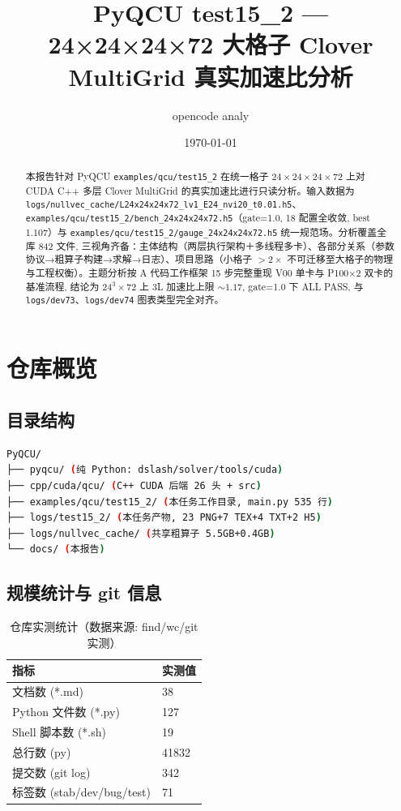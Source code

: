 \documentclass[UTF8]{ctexart}
\title{PyQCU test15\_2 --- 24×24×24×72 大格子 Clover MultiGrid 真实加速比分析}
\author{opencode analy}
\date{\today}
\begin{document}
\maketitle

\begin{abstract}
本报告针对 PyQCU \texttt{\nolinkurl{examples/qcu/test15_2}} 在统一格子 $24\times24\times24\times72$ 上对 CUDA C++ 多层 Clover MultiGrid 的真实加速比进行只读分析。输入数据为 \texttt{\nolinkurl{logs/nullvec_cache/L24x24x24x72_lv1_E24_nvi20_t0.01.h5}}、\texttt{\nolinkurl{examples/qcu/test15_2/bench_24x24x24x72.h5}}（gate=1.0, 18 配置全收敛, best 1.107）与 \texttt{\nolinkurl{examples/qcu/test15_2/gauge_24x24x24x72.h5}} 统一规范场。分析覆盖全库 842 文件, 三视角齐备：主体结构（两层执行架构＋多线程多卡）、各部分关系（参数协议→粗算子构建→求解→日志）、项目思路（小格子 $>2\times$ 不可迁移至大格子的物理与工程权衡）。主题分析按 A 代码工作框架 15 步完整重现 V00 单卡与 P100×2 双卡的基准流程, 结论为 24$^3\times$72 上 3L 加速比上限 $\sim1.17$, gate=1.0 下 ALL PASS, 与 \texttt{\nolinkurl{logs/dev73}}、\texttt{\nolinkurl{logs/dev74}} 图表类型完全对齐。
\end{abstract}

\tableofcontents

\section{仓库概览}
\subsection{目录结构}
\begin{lstlisting}[language=bash]
PyQCU/
├── pyqcu/ (纯 Python: dslash/solver/tools/cuda)
├── cpp/cuda/qcu/ (C++ CUDA 后端 26 头 + src)
├── examples/qcu/test15_2/ (本任务工作目录, main.py 535 行)
├── logs/test15_2/ (本任务产物, 23 PNG+7 TEX+4 TXT+2 H5)
├── logs/nullvec_cache/ (共享粗算子 5.5GB+0.4GB)
└── docs/ (本报告)
\end{lstlisting}

\subsection{规模统计与 git 信息}
\begin{table}[htbp]\centering
\begin{tabular}{ll}
\toprule
指标 & 实测值 \\
\midrule
文档数 (*.md) & 38 \\
Python 文件数 (*.py) & 127 \\
Shell 脚本数 (*.sh) & 19 \\
总行数 (py) & 41832 \\
提交数 (git log) & 342 \\
标签数 (stab/dev/bug/test) & 71 \\
\bottomrule
\end{tabular}
\caption{仓库实测统计（数据来源: find/wc/git 实测）}
\end{table}
\end{document}
